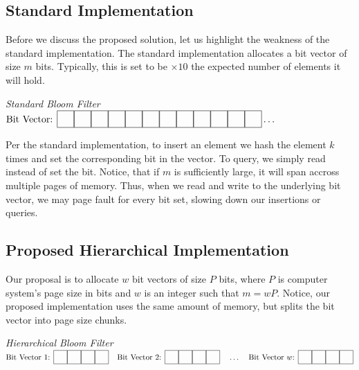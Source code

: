 \newcommand{\sep}{\hspace*{0.15in}}
\newcommand\cell{%
    \fbox{\rule{0.15in}{0pt}\rule[-0.5ex]{0pt}{0.15in}}}

\subsection{Standard Implementation}
Before we discuss the proposed solution, let us highlight the weakness of the standard implementation.
The standard implementation allocates a bit vector of size $m$ bits. Typically, this is set to be $\times 10$ the expected number of elements it will hold.

\begin{center}
    \textit{Standard Bloom Filter}
    \vspace{10pt}\\
    $\text{Bit Vector: } \cell\cell\cell\cell\cell\cell\cell\cell\cell\cell\cell\cell \ldots$
    \vspace{10pt}\\
\end{center}

Per the standard implementation, to insert an element we hash the element $k$ times and set the corresponding bit in the vector.
To query, we simply read instead of set the bit.
Notice, that if $m$ is sufficiently large, it will span accross multiple pages of memory. 
Thus, when we read and write to the underlying bit vector, we may page fault for every bit set, slowing down our insertions or queries.

\subsection{Proposed Hierarchical Implementation}
Our proposal is to allocate $w$ bit vectors of size $P$ bits, where $P$ is computer system's page size in bits and $w$ is an integer such that $m = w P$.
Notice, our proposed implementation uses the same amount of memory, but  splits the bit vector into page size chunks.

\begin{center}
    \textit{Hierarchical Bloom Filter}
    \vspace{10pt}\\
    $\text{Bit Vector 1: }\cell\cell\cell\cell \sep \text{Bit Vector 2: }\cell\cell\cell\cell \sep \ldots \sep \text{Bit Vector $w$: }\cell\cell\cell\cell$
    \vspace{10pt}\\
\end{center}


